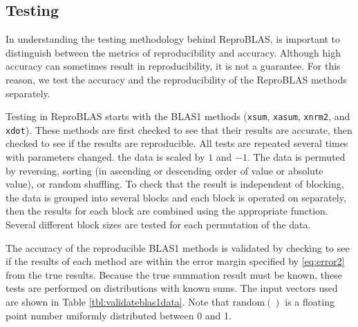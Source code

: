 \subsection{Testing}
  In understanding the testing methodology behind ReproBLAS, is important to distinguish between the metrics of reproducibility and accuracy. Although high accuracy can sometimes result in reproducibility, it is not a guarantee. For this reason, we test the accuracy and the reproducibility of the ReproBLAS methods separately.

  Testing in ReproBLAS starts with the BLAS1 methods (\texttt{xsum}, \texttt{xasum}, \texttt{xnrm2}, and \texttt{xdot}). These methods are first checked to see that their results are accurate, then checked to see if the results are reproducible. All tests are repeated several times with parameters changed. the data is scaled by $1$ and $-1$. The data is permuted by reversing, sorting (in ascending or descending order of value or absolute value), or random shuffling. To check that the result is independent of blocking, the data is grouped into several blocks and each block is operated on separately, then the results for each block are combined using the appropriate function. Several different block sizes are tested for each permutation of the data.

  The accuracy of the reproducible BLAS1 methods is validated by checking to see if the results of each method are within the error margin specified by \eqref{eq:error2} from the true results. Because the true summation result must be known, these tests are performed on distributions with known sums. The input vectors used are shown in Table \ref{tbl:validateblas1data}. Note that $\text{random}()$ is a floating point number uniformly distributed between 0 and 1.

